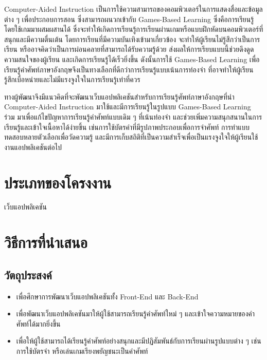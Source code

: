 \documentclass[12pt,oneside,openright,a4paper]{cpe-thai-project}
\begin{document}
\hspace{1cm}
Computer-Aided Instruction เป็นการใช้ความสามารถของคอมพิวเตอร์ในการแสดงสื่อและข้อมูลต่าง ๆ เพื่อประกอบการสอน
ซึ่งสามารถผนวกเข้ากับ Games-Based Learning ซึ่งคือการเรียนรู้โดยใช้เกมมาผสมผสานได้
ซึ่งจะทำให้เกิดการเรียนรู้การเรียนผ่านเกมหรือแบบฝึกหัดบนคอมพิวเตอร์ที่สนุกและมีความตื่นเต้น โดยการเรียนที่มีความบันเทิงเข้ามาเกี่ยวข้อง
จะทำให้ผู้เรียนไม่รู้สึกว่าเป็นการเรียน หรืออาจคิดว่าเป็นการผ่อนคลายที่สามารถได้รับความรู้ด้วย ส่งผลให้การเรียบแบบนี้ช่วยดึงดูดความสนใจของผู้เรียน
และเกิดการเรียนรู้ได้เร็วยิ่งขึ้น ดังนั้นการใช้ Games-Based Learning เพื่อเรียนรู้คำศัพท์ภาษาอังกฤษจึงเป็นทางเลือกที่ดีกว่าการเรียนรู้แบบเน้นการท่องจำ
ที่อาจทำให้ผู้เรียนรู้สึกเบื่อหน่ายและไม่มีแรงจูงใจในการเรียนรู้เท่าที่ควร

\hspace{1cm}
ทางผู้พัฒนาจึงมีแนวคิดที่จะพัฒนาเว็บแอปพลิเคชันสำหรับการเรียนรู้ศัพท์ภาษาอังกฤษที่นำ Computer-Aided Instruction
มาใช้และมีการเรียนรู้ในรูปแบบ Games-Based Learning ร่วม มาเพื่อแก้ไขปัญหาการเรียนรู้คำศัพท์แบบเดิม ๆ ที่เน้นท่องจำ
และช่วยเพิ่มความสนุกสนานในการเรียนรู้และเข้าใจเนื้อหาได้ง่ายขึ้น เช่นการใช้บัตรคำที่มีรูปภาพประกอบเพื่อการจำศัพท์
การทำแบบทดสอบหลายตัวเลือกเพื่อวัดความรู้ และมีการเก็บสถิติที่เป็นความสำเร็จเพื่อเป็นแรงจูงใจให้ผู้เรียนใช้งานแอปพลิเคชันต่อไป

\section{ประเภทของโครงงาน }

\hspace{1cm}เว็บแอปพลิเคชัน

\section{วิธีการที่นำเสนอ}

\subsection{วัตถุประสงค์}

\begin{itemize}
	\item เพื่อศึกษาการพัฒนาเว็บแอปพลิเคชันทั้ง Front-End และ Back-End
	\item เพื่อพัฒนาเว็บแอปพลิเคชันมาให้ผู้ใช้สามารถเรียนรู้คำศัพท์ใหม่ ๆ และเข้าใจความหมายของคำศัพท์ได้มากยิ่งขึ้น
	\item เพื่อให้ผู้ใช้สามารถได้เรียนรู้คำศัพท์อย่างสนุกและมีปฏิสัมพันธ์กับการเรียนผ่านรูปแบบต่าง ๆ เช่นการใช้บัตรจำ หรือเล่นเกมเรียงพยัญชนะเป็นคำศัพท์
\end{itemize}
\end{document}

